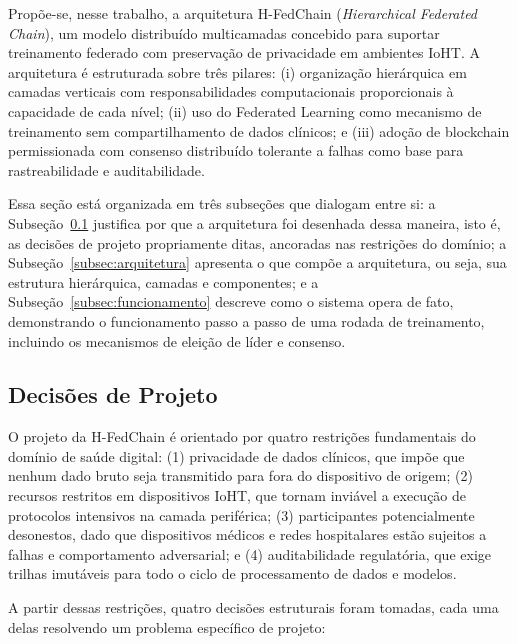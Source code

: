 \documentclass[12pt]{article}
\begin{document}
Propõe-se, nesse trabalho, a arquitetura H-FedChain (\textit{Hierarchical Federated Chain}), um modelo distribuído multicamadas concebido para suportar treinamento federado com preservação de privacidade em ambientes IoHT. A arquitetura é estruturada sobre três pilares: (i) organização hierárquica em camadas verticais com responsabilidades computacionais proporcionais à capacidade de cada nível; (ii) uso do Federated Learning como mecanismo de treinamento sem compartilhamento de dados clínicos; e (iii) adoção de blockchain permissionada com consenso distribuído tolerante a falhas como base para rastreabilidade e auditabilidade.

Essa seção está organizada em três subseções que dialogam entre si: a Subseção~\ref{subsec:decisoes} justifica por que a arquitetura foi desenhada dessa maneira, isto é, as decisões de projeto propriamente ditas, ancoradas nas restrições do domínio; a Subseção~\ref{subsec:arquitetura} apresenta o que compõe a arquitetura, ou seja, sua estrutura hierárquica, camadas e componentes; e a Subseção~\ref{subsec:funcionamento} descreve como o sistema opera de fato, demonstrando o funcionamento passo a passo de uma rodada de treinamento, incluindo os mecanismos de eleição de líder e consenso.

\subsection{Decisões de Projeto}
\label{subsec:decisoes}

O projeto da H-FedChain é orientado por quatro restrições fundamentais do domínio de saúde digital: (1) privacidade de dados clínicos, que impõe que nenhum dado bruto seja transmitido para fora do dispositivo de origem; (2) recursos restritos em dispositivos IoHT, que tornam inviável a execução de protocolos intensivos na camada periférica; (3) participantes potencialmente desonestos, dado que dispositivos médicos e redes hospitalares estão sujeitos a falhas e comportamento adversarial; e (4) auditabilidade regulatória, que exige trilhas imutáveis para todo o ciclo de processamento de dados e modelos.

A partir dessas restrições, quatro decisões estruturais foram tomadas, cada uma delas resolvendo um problema específico de projeto:
\end{document}
